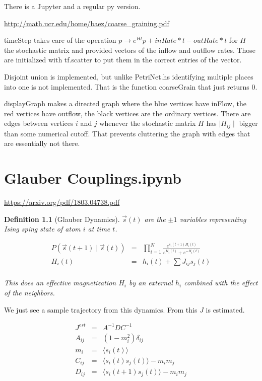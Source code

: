 \documentclass[11pt]{book}
\theoremstyle{change}
\newtheorem{definition}[equation]{Definition}
\theoremstyle{nonumberplain}
\numberwithin{equation}{section}
\newcommand\abs[1]{ \mid #1 \mid }
\begin{document}
There is a Jupyter and a regular py version.

\url{http://math.ucr.edu/home/baez/coarse_graining.pdf}

timeStep takes care of the operation $p \to e^{Ht} p + inRate*t - outRate*t$ for $H$ the stochastic matrix and provided vectors of the inflow and outflow rates. Those are initialized with tf.scatter to put them in the correct entries of the vector.

Disjoint union is implemented, but unlike PetriNet.hs identifying multiple places into one is not implemented. That is the function coarseGrain that just returns 0.

displayGraph makes a directed graph where the blue vertices have inFlow, the red vertices have outflow, the black vertices are the ordinary vertices. There are edges between vertices $i$ and $j$ whenever the stochastic matrix $H$ has $\abs{H_{ij}}$ bigger than some numerical cutoff. That prevents cluttering the graph with edges that are essentially not there.

\chapter{Glauber Couplings.ipynb}

\url{https://arxiv.org/pdf/1803.04738.pdf}

\begin{definition}[Glauber Dynamics]
$\vec{s}(t)$ are the $\pm 1$ variables representing Ising sping state of atom $i$ at time $t$.

\begin{eqnarray*}
P ( \vec{s}(t+1) \mid \vec{s}(t) ) &=& \prod_{i=1}^N \frac{ e^{s_i (t+1) H_i (t)}}{e^{H_i (t)} + e^{- H_i (t)}}\\
H_i (t) &=& h_i (t) + \sum J_{ij} s_j (t)\\
\end{eqnarray*}

This does an effective magnetization $H_i$ by an external $h_i$ combined with the effect of the neighbors.

\end{definition}

We just see a sample trajectory from this dynamics. From this $J$ is estimated.

\begin{eqnarray*}
J^{est} &=& A^{-1} D C^{-1}\\
A_{ij} &=& (1 - m_i^2 ) \delta_{ij}\\
m_i &=& \langle s_i (t) \rangle\\
C_{ij} &=& \langle s_i (t) s_j (t) \rangle - m_i m_j\\
D_{ij} &=& \langle s_i (t+1) s_j (t) \rangle - m_i m_j\\
\end{eqnarray*}
\end{document}
